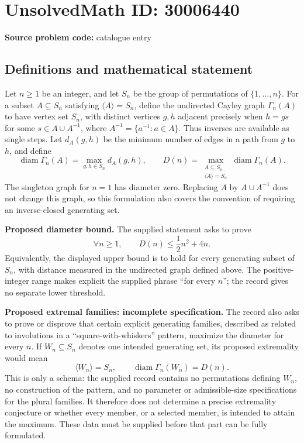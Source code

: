 \documentclass[11pt]{article}
\begin{document}
\section*{UnsolvedMath ID: 30006440}
\textbf{Source problem code:} catalogue entry
\subsection{Definitions and mathematical statement}
Let \(n\geq 1\) be an integer, and let \(S_n\) be the group of permutations of \(\{1,\ldots,n\}\). For a subset \(A\subseteq S_n\) satisfying \(\langle A\rangle=S_n\), define the undirected Cayley graph \(\Gamma_n(A)\) to have vertex set \(S_n\), with distinct vertices \(g,h\) adjacent precisely when \(h=gs\) for some \(s\in A\cup A^{-1}\), where \(A^{-1}=\{a^{-1}:a\in A\}\). Thus inverses are available as single steps. Let \(d_A(g,h)\) be the minimum number of edges in a path from \(g\) to \(h\), and define
\[
\operatorname{diam}\Gamma_n(A)=\max_{g,h\in S_n}d_A(g,h),\qquad
D(n)=\max_{\substack{A\subseteq S_n\\\langle A\rangle=S_n}}\operatorname{diam}\Gamma_n(A).
\]
The singleton graph for \(n=1\) has diameter zero. Replacing \(A\) by \(A\cup A^{-1}\) does not change this graph, so this formulation also covers the convention of requiring an inverse-closed generating set.

\textbf{Proposed diameter bound.} The supplied statement asks to prove
\[
\forall n\geq 1,\qquad D(n)\leq \frac{1}{2}n^2+4n.
\]
Equivalently, the displayed upper bound is to hold for every generating subset of \(S_n\), with distance measured in the undirected graph defined above. The positive-integer range makes explicit the supplied phrase ``for every \(n\)''; the record gives no separate lower threshold.

\textbf{Proposed extremal families: incomplete specification.} The record also asks to prove or disprove that certain explicit generating families, described as related to involutions in a ``square-with-whiskers'' pattern, maximize the diameter for every \(n\). If \(W_n\subseteq S_n\) denotes one intended generating set, its proposed extremality would mean
\[
\langle W_n\rangle=S_n,
\qquad
\operatorname{diam}\Gamma_n(W_n)=D(n).
\]
This is only a schema: the supplied record contains no permutations defining \(W_n\), no construction of the pattern, and no parameter or admissible-size specifications for the plural families. It therefore does not determine a precise extremality conjecture or whether every member, or a selected member, is intended to attain the maximum. These data must be supplied before that part can be fully formulated.
\end{document}
